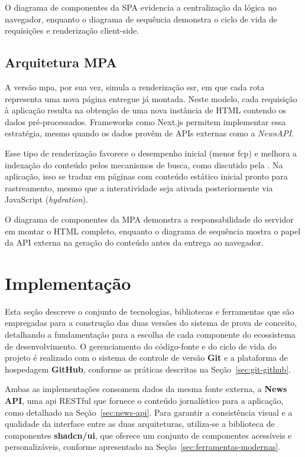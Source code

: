 O diagrama de componentes da SPA evidencia a centralização da lógica no navegador, enquanto o diagrama de sequência demonstra o ciclo de vida de requisições e renderização client-side.

\subsection{Arquitetura MPA}

A versão \acrshort{mpa}, por sua vez, simula a renderização \acrshort{ssr}, em que cada rota representa uma nova página entregue já montada. Neste modelo, cada requisição à aplicação resulta na obtenção de uma nova instância de HTML contendo os dados pré-processados. Frameworks como Next.js permitem implementar essa estratégia, mesmo quando os dados provêm de APIs externas como a \textit{NewsAPI}.

Esse tipo de renderização favorece o desempenho inicial (menor \acrshort{fcp}) e melhora a indexação do conteúdo pelos mecanismos de busca, como discutido pela \cite{atori2024}. Na aplicação, isso se traduz em páginas com conteúdo estático inicial pronto para rastreamento, mesmo que a interatividade seja ativada posteriormente via JavaScript (\textit{hydration}).

O diagrama de componentes da MPA demonstra a responsabilidade do servidor em montar o HTML completo, enquanto o diagrama de sequência mostra o papel da API externa na geração do conteúdo antes da entrega ao navegador.



\section{Implementação}
\label{sec:implementacao}

Esta seção descreve o conjunto de tecnologias, bibliotecas e ferramentas que são empregadas para a construção das duas versões do sistema de prova de conceito, detalhando a fundamentação para a escolha de cada componente do ecossistema de desenvolvimento. O gerenciamento do código-fonte e do ciclo de vida do projeto é realizado com o sistema de controle de versão \textbf{Git} e a plataforma de hospedagem \textbf{GitHub}, conforme as práticas descritas na Seção~\ref{sec:git-github}.

Ambas as implementações consomem dados da mesma fonte externa, a \textbf{News API}, uma \acrshort{api} RESTful que fornece o conteúdo jornalístico para a aplicação, como detalhado na Seção~\ref{sec:news-api}. Para garantir a consistência visual e a qualidade da interface entre as duas arquiteturas, utiliza-se a biblioteca de componentes \textbf{shadcn/ui}, que oferece um conjunto de componentes acessíveis e personalizáveis, conforme apresentado na Seção~\ref{sec:ferramentas-modernas}.

